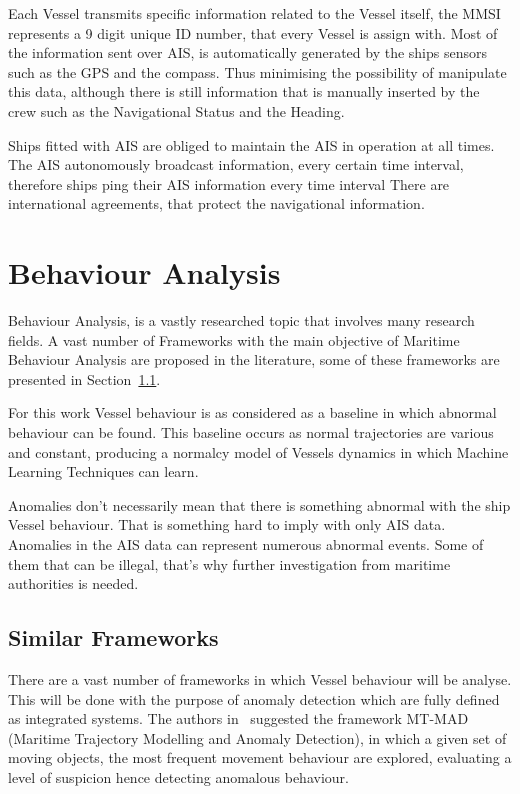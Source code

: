 Each Vessel transmits specific information related to the Vessel itself, the MMSI represents a 9 digit unique ID number, that every Vessel is assign with.
Most of the information sent over AIS, is automatically generated by the ships sensors such as the GPS and the compass. Thus minimising the possibility of manipulate this data, although there is still information that is manually inserted by the crew such as the Navigational Status and the Heading.

Ships fitted with AIS are obliged to maintain the AIS in operation at all times. The AIS autonomously broadcast information, every certain time interval, therefore ships ping their AIS information every time interval   There are international agreements, that protect the navigational information.


\section{Behaviour Analysis}
Behaviour Analysis, is a vastly researched topic that involves many research fields. A vast number of Frameworks with the main objective of Maritime Behaviour Analysis are proposed in the literature, some of these frameworks are presented in Section~\ref{section: Similar Frameworks}.

For this work Vessel behaviour is as considered as a baseline in which abnormal behaviour can be found. This baseline occurs as normal trajectories are various and constant, producing a normalcy model of Vessels dynamics in which Machine Learning Techniques can learn.

Anomalies don't necessarily mean that there is something abnormal with the ship Vessel behaviour. That is something hard to imply with only AIS data. Anomalies in the AIS data can represent numerous abnormal events. Some of them that can be illegal, that's why further investigation from maritime authorities is needed. 

\subsection{Similar Frameworks}
\label{section: Similar Frameworks}
There are a vast number of frameworks in which Vessel behaviour will be analyse. This will be done with the purpose of anomaly detection which are fully defined as integrated systems. The authors in~\cite{Lei2016} suggested the framework MT-MAD (Maritime Trajectory Modelling and Anomaly Detection), in which a given set of moving objects, the most frequent movement behaviour are explored, evaluating a level of suspicion hence detecting anomalous behaviour.

